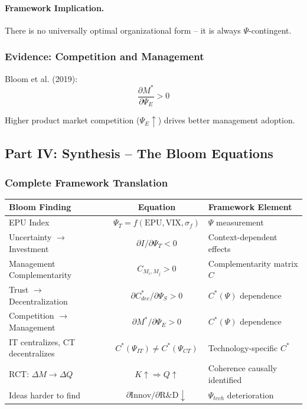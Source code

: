 \paragraph{Framework Implication.}
There is no universally optimal organizational form – it is always $\Psi$-contingent.

\subsubsection{Evidence: Competition and Management}

Bloom et al. (2019):
\begin{equation}
\frac{\partial M^*}{\partial \Psi_E} > 0
\end{equation}

Higher product market competition ($\Psi_E \uparrow$) drives better management adoption.

\subsection{Part IV: Synthesis – The Bloom Equations}

\subsubsection{Complete Framework Translation}

\begin{center}
\renewcommand{\arraystretch}{1.5}
\begin{tabular}{|l|c|l|}
\hline
\textbf{Bloom Finding} & \textbf{Equation} & \textbf{Framework Element} \\
\hline
EPU Index & $\Psi_T = f(\text{EPU}, \text{VIX}, \sigma_f)$ & $\Psi$ measurement \\
\hline
Uncertainty $\to$ Investment & $\partial I / \partial \Psi_T < 0$ & Context-dependent effects \\
\hline
Management Complementarity & $C_{M_i, M_j} > 0$ & Complementarity matrix $C$ \\
\hline
Trust $\to$ Decentralization & $\partial C^*_{dec} / \partial \Psi_S > 0$ & $C^*(\Psi)$ dependence \\
\hline
Competition $\to$ Management & $\partial M^* / \partial \Psi_E > 0$ & $C^*(\Psi)$ dependence \\
\hline
IT centralizes, CT decentralizes & $C^*(\Psi_{IT}) \neq C^*(\Psi_{CT})$ & Technology-specific $C^*$ \\
\hline
RCT: $\Delta M \to \Delta Q$ & $K \uparrow \Rightarrow Q \uparrow$ & Coherence causally identified \\
\hline
Ideas harder to find & $\partial \text{Innov}/\partial \text{R\&D} \downarrow$ & $\Psi_{tech}$ deterioration \\
\hline
\end{tabular}
\end{center}

